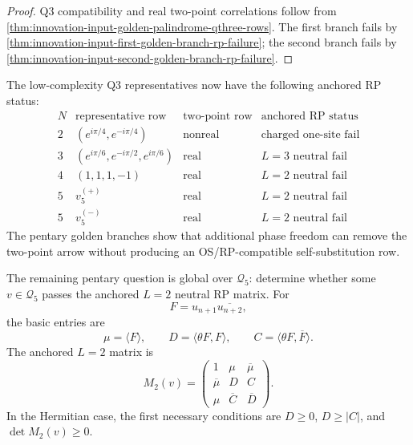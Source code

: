\begin{proof}
Q3 compatibility and real two-point correlations follow from
\autoref{thm:innovation-input-golden-palindrome-qthree-rows}. The first
branch fails by
\autoref{thm:innovation-input-first-golden-branch-rp-failure}; the second
branch fails by
\autoref{thm:innovation-input-second-golden-branch-rp-failure}.
\end{proof}

\begin{principle}
\label{prin:innovation-input-anchored-rp-status-table}
The low-complexity Q3 representatives now have the following anchored RP
status:
$$
\begin{array}{c|c|c|c}
N & \text{representative row} & \text{two-point row} &
\text{anchored RP status}\\
\hline
2 & (e^{i\pi/4},e^{-i\pi/4}) &
\text{nonreal} &
\text{charged one-site fail}\\
3 & (e^{i\pi/6},e^{-i\pi/2},e^{i\pi/6}) &
\text{real} &
L=3\text{ neutral fail}\\
4 & (1,1,1,-1) &
\text{real} &
L=2\text{ neutral fail}\\
5 & v_5^{(+)} &
\text{real} &
L=2\text{ neutral fail}\\
5 & v_5^{(-)} &
\text{real} &
L=2\text{ neutral fail}
\end{array}
$$
The pentary golden branches show that additional phase freedom can remove
the two-point arrow without producing an OS/RP-compatible
self-substitution row.
\end{principle}

\begin{principle}
\label{prin:innovation-input-pentary-full-window-target}
The remaining pentary question is global over $\mathcal Q_5$: determine
whether some $v\in\mathcal Q_5$ passes the anchored $L=2$ neutral RP
matrix. For
$$
F=u_{n+1}\overline{u_{n+2}},
$$
the basic entries are
$$
\mu=\langle F\rangle,
\qquad
D=\langle\theta F,F\rangle,
\qquad
C=\langle\theta F,\overline F\rangle.
$$
The anchored $L=2$ matrix is
$$
M_2(v)=
\left(
\begin{array}{ccc}
1 & \mu & \overline\mu\\
\overline\mu & D & C\\
\mu & \overline C & \overline D
\end{array}
\right).
$$
In the Hermitian case, the first necessary conditions are $D\ge0$,
$D\ge |C|$, and $\det M_2(v)\ge0$.
\end{principle}
